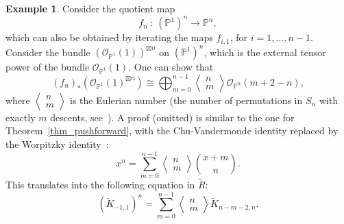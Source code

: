 \documentclass{article}
\def\lra{\longrightarrow}
\newcommand{\mcO}{\mathcal{O}}
\newcommand{\wtR}{\widetilde{R}}
\newcommand{\wtK}{\widetilde{K}}
\newcommand{\PP}{\mathbb{P}}
\theoremstyle{definition}
\newtheorem{example}[thm]{Example}
\theoremstyle{definition}
\begin{document}
\begin{example}\label{example_worp}
    Consider the quotient map
    \[
 f_n \ : \ (\PP^1)^n \lra \PP^n,
 \]
 which can also be obtained by iterating the maps $f_{i,1}$, for $i=1,\dots,n-1$.
Consider the bundle $(\mcO_{\PP^1}(1))^{\boxtimes n}$ on $(\PP^1)^n$, which is the external tensor power of the bundle $\mcO_{\PP^1}(1)$. One can show that
\begin{equation}
     (f_n)_{\ast}(\mcO_{\PP^1}(1)^{\boxtimes n}) \cong \bigoplus_{m=0}^{n-1} \left\langle \begin{matrix} n \\ m \end{matrix} \right\rangle\mcO_{\PP^n}(m + 2 - n),
     \end{equation}
where $\left\langle \begin{smallmatrix} n \\ m \end{smallmatrix}\right\rangle$ is the Eulerian number (the number of permutations in $S_n$ with exactly $m$ descents, see~\cite{Pet}).
A proof (omitted) is similar to the one for Theorem~\ref{thm_pushforward}, with the Chu-Vandermonde identity replaced by
 the Worpitzky identity~\cite{Pet}:
\begin{equation}\label{eq_worpit}
x^n = \sum_{m=0}^{n-1} \left\langle \begin{matrix} n \\ m \end{matrix} \right\rangle \binom{x+m}{n}.
\end{equation}
This translates into the following equation in $\wtR$:
\[
(\wtK_{-1,1})^n = \sum_{m=0}^{n-1}
\left\langle \begin{matrix} n \\ m \end{matrix} \right\rangle\wtK_{n-m-2,n}.
\]

\end{example}
\end{document}
